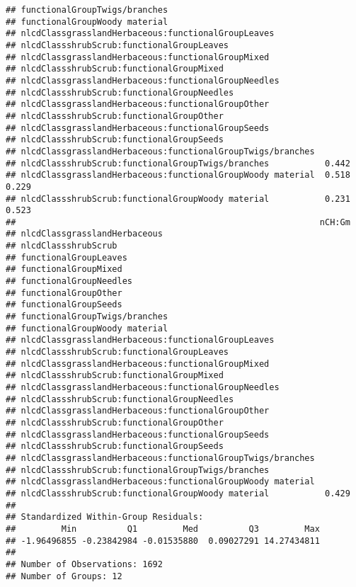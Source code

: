 \documentclass[]{article}
\begin{document}
\begin{verbatim}
## functionalGroupTwigs/branches                                           
## functionalGroupWoody material                                           
## nlcdClassgrasslandHerbaceous:functionalGroupLeaves                      
## nlcdClassshrubScrub:functionalGroupLeaves                               
## nlcdClassgrasslandHerbaceous:functionalGroupMixed                       
## nlcdClassshrubScrub:functionalGroupMixed                                
## nlcdClassgrasslandHerbaceous:functionalGroupNeedles                     
## nlcdClassshrubScrub:functionalGroupNeedles                              
## nlcdClassgrasslandHerbaceous:functionalGroupOther                       
## nlcdClassshrubScrub:functionalGroupOther                                
## nlcdClassgrasslandHerbaceous:functionalGroupSeeds                       
## nlcdClassshrubScrub:functionalGroupSeeds                                
## nlcdClassgrasslandHerbaceous:functionalGroupTwigs/branches              
## nlcdClassshrubScrub:functionalGroupTwigs/branches           0.442       
## nlcdClassgrasslandHerbaceous:functionalGroupWoody material  0.518  0.229
## nlcdClassshrubScrub:functionalGroupWoody material           0.231  0.523
##                                                            nCH:Gm
## nlcdClassgrasslandHerbaceous                                     
## nlcdClassshrubScrub                                              
## functionalGroupLeaves                                            
## functionalGroupMixed                                             
## functionalGroupNeedles                                           
## functionalGroupOther                                             
## functionalGroupSeeds                                             
## functionalGroupTwigs/branches                                    
## functionalGroupWoody material                                    
## nlcdClassgrasslandHerbaceous:functionalGroupLeaves               
## nlcdClassshrubScrub:functionalGroupLeaves                        
## nlcdClassgrasslandHerbaceous:functionalGroupMixed                
## nlcdClassshrubScrub:functionalGroupMixed                         
## nlcdClassgrasslandHerbaceous:functionalGroupNeedles              
## nlcdClassshrubScrub:functionalGroupNeedles                       
## nlcdClassgrasslandHerbaceous:functionalGroupOther                
## nlcdClassshrubScrub:functionalGroupOther                         
## nlcdClassgrasslandHerbaceous:functionalGroupSeeds                
## nlcdClassshrubScrub:functionalGroupSeeds                         
## nlcdClassgrasslandHerbaceous:functionalGroupTwigs/branches       
## nlcdClassshrubScrub:functionalGroupTwigs/branches                
## nlcdClassgrasslandHerbaceous:functionalGroupWoody material       
## nlcdClassshrubScrub:functionalGroupWoody material           0.429
## 
## Standardized Within-Group Residuals:
##         Min          Q1         Med          Q3         Max 
## -1.96496855 -0.23842984 -0.01535880  0.09027291 14.27434811 
## 
## Number of Observations: 1692
## Number of Groups: 12
\end{verbatim}
\end{document}
